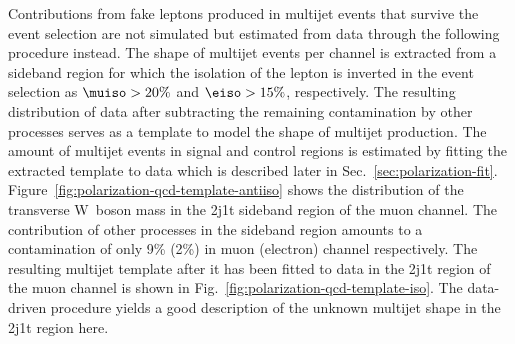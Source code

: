 
Contributions from fake leptons produced in multijet events that survive the event selection are not simulated but estimated from data through the following procedure instead. The shape of multijet events per channel is extracted from a sideband region for which the isolation of the lepton is inverted in the event selection as $\muiso>20\%$ and $\eiso>15\%$, respectively. The resulting distribution of data after subtracting the remaining contamination by other processes serves as a template to model the shape of multijet production. The amount of multijet events in signal and control regions is estimated by fitting the extracted template to data which is described later in Sec.~\ref{sec:polarization-fit}. Figure~\ref{fig:polarization-qcd-template-antiiso} shows the distribution of the transverse W~boson mass in the 2j1t sideband region of the muon channel. The contribution of other processes in the sideband region amounts to a contamination of only 9\% (2\%) in muon (electron) channel respectively. The resulting multijet template after it has been fitted to data in the 2j1t region of the muon channel is shown in Fig.~\ref{fig:polarization-qcd-template-iso}. The data-driven procedure yields a good description of the unknown multijet shape in the 2j1t region here.

